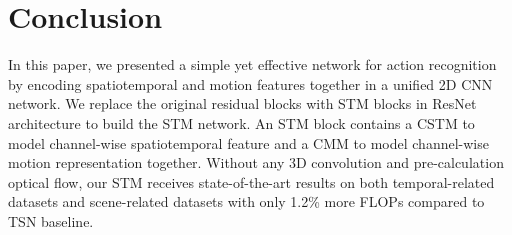 \documentclass[10pt,twocolumn,letterpaper]{article}
\begin{document}
\section{Conclusion}
	In this paper, we presented a simple yet effective network for action recognition by encoding spatiotemporal and motion features together in a unified 2D CNN network. We replace the original residual blocks with STM blocks in ResNet architecture to build the STM network. An STM block contains a CSTM to model channel-wise spatiotemporal feature and a CMM to model channel-wise motion representation together. Without any 3D convolution and pre-calculation optical flow, our STM receives state-of-the-art results on both temporal-related datasets and scene-related datasets with only 1.2\% more FLOPs compared to TSN baseline.
	
{\small
	
	
}
\end{document}
